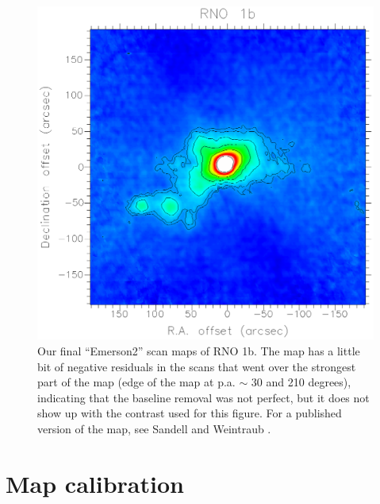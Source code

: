 \documentclass[twoside,11pt]{article}
\newcommand{\xlabel}[1]{}
\renewcommand{\_}{\texttt{\symbol{95}}}
\begin{document}
\begin{figure}
\begin{center}
\includegraphics[width=\textwidth]{sc11_fig10.eps}
\caption{Our final ``Emerson2'' scan maps of RNO 1b. The map has a
little bit of negative residuals in the scans that went over the
strongest part of the map (edge of the map at p.a. $\sim$ 30 and 210
degrees), indicating that the baseline removal was not perfect, but it
does not show up with the contrast used for this figure. For a
published version of the map, see Sandell and Weintraub \cite{Sandell01}.}
\label{fig:final}
\end{center}
\end{figure}

\section{\xlabel{Calibration} Map calibration  \label{Calibration}}
\end{document}
